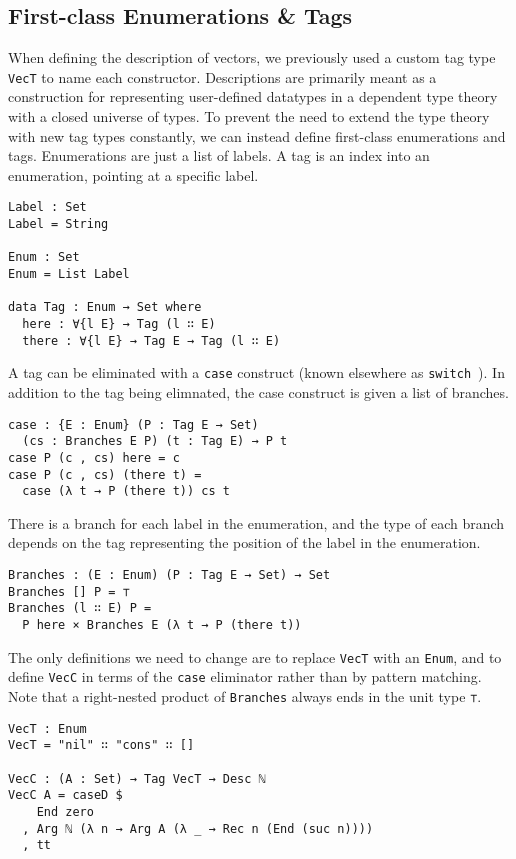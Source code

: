 \documentclass[preprint,nonatbib]{sigplanconf}
\begin{document}
\subsection{First-class Enumerations \& Tags}

When defining the description of vectors, we previously used a custom
tag type {\tt VecT} to name each constructor. Descriptions are
primarily meant as a construction for representing user-defined
datatypes in a dependent type theory with a closed universe of types.
To prevent the need to extend the type theory with new tag types
constantly, we can instead define first-class enumerations and tags.
Enumerations are just a list of labels. A tag is an index into an
enumeration, pointing at a specific label.

\begin{verbatim}
Label : Set
Label = String

Enum : Set
Enum = List Label

data Tag : Enum → Set where
  here : ∀{l E} → Tag (l ∷ E)
  there : ∀{l E} → Tag E → Tag (l ∷ E)
\end{verbatim}

A tag can be eliminated with a {\tt case} construct (known elsewhere as
{\tt switch}~\citep{Chapman:2010:GAL:1932681.1863547,dagand:phd}).
In addition to the tag being elimnated, the case construct is given a
list of branches.

\begin{verbatim}
case : {E : Enum} (P : Tag E → Set)
  (cs : Branches E P) (t : Tag E) → P t
case P (c , cs) here = c
case P (c , cs) (there t) =
  case (λ t → P (there t)) cs t
\end{verbatim}

There is a branch for each label in the enumeration, and the type of
each branch depends on the tag representing the position of the label
in the enumeration.

\begin{verbatim}
Branches : (E : Enum) (P : Tag E → Set) → Set
Branches [] P = ⊤
Branches (l ∷ E) P =
  P here × Branches E (λ t → P (there t))
\end{verbatim}

The only definitions we need to change are to replace
{\tt VecT} with an {\tt Enum}, and to define
{\tt VecC} in terms of the {\tt case} eliminator rather than
by pattern matching. Note that a right-nested product of
{\tt Branches} always ends in the unit type {\tt ⊤}.

\begin{verbatim}
VecT : Enum
VecT = "nil" ∷ "cons" ∷ []

VecC : (A : Set) → Tag VecT → Desc ℕ
VecC A = caseD $
    End zero
  , Arg ℕ (λ n → Arg A (λ _ → Rec n (End (suc n))))
  , tt
\end{verbatim}
\end{document}
